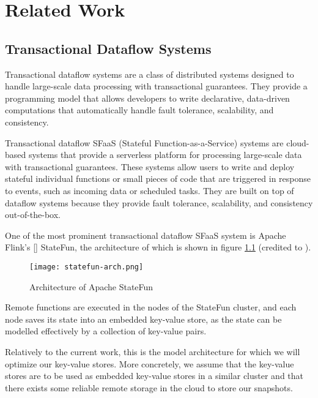 
\chapter{Related Work}

\label{Chapter2-related-work}

\section{Transactional Dataflow Systems}

Transactional dataflow systems are a class of distributed systems designed to handle large-scale data processing with transactional guarantees.
They provide a programming model that allows developers to write declarative, data-driven computations that automatically handle fault tolerance, scalability, and consistency.

Transactional dataflow SFaaS (Stateful Function-as-a-Service) systems are cloud-based systems that provide a serverless platform for processing large-scale data with transactional guarantees.
These systems allow users to write and deploy stateful individual functions or small pieces of code that are triggered in response to events, such as incoming data or scheduled tasks. They are built on top of dataflow systems because they provide fault tolerance, scalability, and consistency out-of-the-box.

One of the most prominent transactional dataflow SFaaS system is Apache Flink's [\cite{apache-flink}] StateFun, the architecture of which is shown in figure \ref{fig:statefun-arch} (credited to \cite{transactions-serverless-functions-leveraging-stateful-dataflows}).

\begin{figure}[h]
    \centering
    \texttt{[image: statefun-arch.png]}
    \caption{Architecture of Apache StateFun}
    \label{fig:statefun-arch}
\end{figure}

Remote functions are executed in the nodes of the StateFun cluster, and each node saves its state into an embedded key-value store, as the state can be modelled effectively by a collection of key-value pairs.

Relatively to the current work, this is the model architecture for which we will optimize our key-value stores. More concretely, we assume that the key-value stores are to be used as embedded key-value stores in a similar cluster and that there exists some reliable remote storage in the cloud to store our snapshots.

